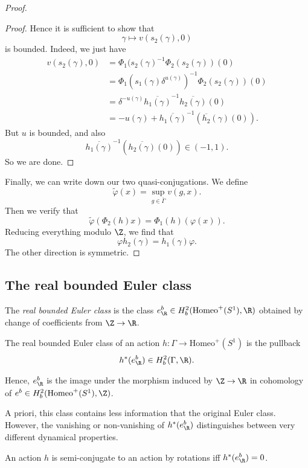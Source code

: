 \documentclass[a4paper]{article}
\newcommand\Homeo{\mathrm{Homeo}}
\begin{document}
\begin{proof}
\begin{proof}
    Hence it is sufficient to show that
    \[
      \gamma \mapsto v(s_2(\gamma), 0)
    \]
    is bounded. Indeed, we just have
    \begin{align*}
      v(s_2(\gamma), 0) &= \Phi_1 (s_2(\gamma)^{-1} \Phi_2(s_2(\gamma))(0)\\
      &= \Phi_1(s_1(\gamma) \delta^{u(\gamma)})^{-1} \Phi_2(s_2(\gamma))(0)\\
      &= \delta^{-u(\gamma)} \overline{h_1(\gamma)}^{-1} \overline{h_2(\gamma)} (0)\\
      &= - u(\gamma) + \overline{h_1(\gamma)}^{-1} (\overline{h_2}(\gamma)(0)).
    \end{align*}
    But $u$ is bounded, and also
    \[
      \overline{h_1(\gamma)}^{-1} (\overline{h_2(\gamma)}(0)) \in (-1, 1).
    \]
    So we are done.
  \end{proof}
  Finally, we can write down our two quasi-conjugations. We define
  \[
    \tilde{\varphi}(x) = \sup_{g \in \bar{\Gamma}} v(g, x).
  \]
  Then we verify that
  \[
    \tilde{\varphi}(\Phi_2(h) x) = \Phi_1(h)(\varphi(x)).
  \]
  Reducing everything modulo $\Z$, we find that
  \[
    \varphi h_2(\gamma) = h_1(\gamma) \varphi.
  \]
  The other direction is symmetric.
\end{proof}

\subsection{The real bounded Euler class}
\begin{defi}
  The \emph{real bounded Euler class} is the class $e_\R^b \in H_b^2(\Homeo^+(S^1), \R)$ obtained by change of coefficients from $\Z \to \R$.

  The real bounded Euler class of an action $h: \Gamma \to \Homeo^+(S^1)$ is the pullback
  \[
    h^*(e_\R^b) \in H_b^2(\Gamma, \R).
  \]
\end{defi}

Hence, $e^b_\R$ is the image under the morphism induced by $\Z \to \R$ in cohomology of $e^b \in H_b^2(\Homeo^+(S^1), \Z)$.

A priori, this class contains less information that the original Euler class. However, the vanishing or non-vanishing of $h^*(e^b_\R)$ distinguishes between very different dynamical properties.

\begin{cor}
  An action $h$ is semi-conjugate to an action by rotations iff $h^*(e_\R^b) = 0$.
\end{cor}
\end{document}
